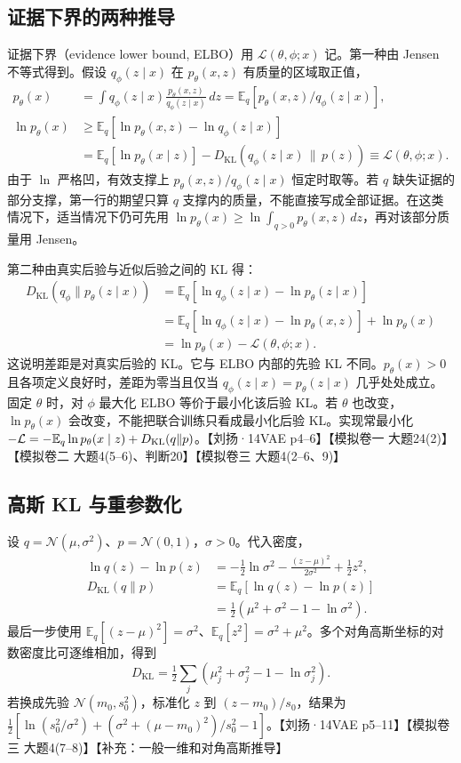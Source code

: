 \documentclass[UTF8,a4paper,zihao=-4,fontset=fandol]{ctexrep}
\begin{document}
\subsection*{证据下界的两种推导}

证据下界（evidence lower bound, ELBO）用 $\mathcal L(\theta,\phi;x)$ 记。第一种由 Jensen 不等式得到。假设 $q_\phi(z\mid x)$ 在 $p_\theta(x,z)$ 有质量的区域取正值，
\begin{align*}
 p_\theta(x)
  &=\int q_\phi(z\mid x)\frac{p_\theta(x,z)}{q_\phi(z\mid x)}\,dz
     =\mathbb E_q[p_\theta(x,z)/q_\phi(z\mid x)],\\
 \ln p_\theta(x)
  &\ge \mathbb E_q[\ln p_\theta(x,z)-\ln q_\phi(z\mid x)]\\
  &=\mathbb E_q[\ln p_\theta(x\mid z)]
     -D_{\mathrm{KL}}\!\left(q_\phi(z\mid x)\,\|\,p(z)\right)
     \equiv\mathcal L(\theta,\phi;x).
\end{align*}
由于 $\ln$ 严格凹，有效支撑上 $p_\theta(x,z)/q_\phi(z\mid x)$ 恒定时取等。若 $q$ 缺失证据的部分支撑，第一行的期望只算 $q$ 支撑内的质量，不能直接写成全部证据。在这类情况下，适当情况下仍可先用 $\ln p_\theta(x)\ge\ln\int_{q>0}p_\theta(x,z)\,dz$，再对该部分质量用 Jensen。

第二种由真实后验与近似后验之间的 KL 得：
\begin{align*}
 D_{\mathrm{KL}}(q_\phi\|p_\theta(z\mid x))
 &=\mathbb E_q[\ln q_\phi(z\mid x)-\ln p_\theta(z\mid x)]\\
 &=\mathbb E_q[\ln q_\phi(z\mid x)-\ln p_\theta(x,z)]
   +\ln p_\theta(x)\\
 &=\ln p_\theta(x)-\mathcal L(\theta,\phi;x).
\end{align*}
这说明差距是对真实后验的 KL。它与 ELBO 内部的先验 KL 不同。$p_\theta(x)>0$ 且各项定义良好时，差距为零当且仅当 $q_\phi(z\mid x)=p_\theta(z\mid x)$ 几乎处处成立。固定 $\theta$ 时，对 $\phi$ 最大化 ELBO 等价于最小化该后验 KL。若 $\theta$ 也改变，$\ln p_\theta(x)$ 会改变，不能把联合训练只看成最小化后验 KL。实现常最小化 $-\mathcal L=-\mathbb E_q\ln p_\theta(x\mid z)+D_{\rm KL}(q\|p)$。【刘扬·14VAE p4--6】【模拟卷一 大题24(2)】【模拟卷二 大题4(5--6)、判断20】【模拟卷三 大题4(2--6、9)】

\subsection*{高斯 KL 与重参数化}

设 $q=\mathcal N(\mu,\sigma^2)$、$p=\mathcal N(0,1)$，$\sigma>0$。代入密度，
\begin{align*}
 \ln q(z)-\ln p(z)
 &=-\tfrac12\ln\sigma^2-\frac{(z-\mu)^2}{2\sigma^2}+\tfrac12 z^2,\\
 D_{\mathrm{KL}}(q\|p)
 &=\mathbb E_q[\ln q(z)-\ln p(z)]\\
 &=\tfrac12\left(\mu^2+\sigma^2-1-\ln\sigma^2\right).
\end{align*}
最后一步使用 $\mathbb E_q[(z-\mu)^2]=\sigma^2$、$\mathbb E_q[z^2]=\sigma^2+\mu^2$。多个对角高斯坐标的对数密度比可逐维相加，得到
\[
 D_{\mathrm{KL}}=\tfrac12\sum_j(\mu_j^2+\sigma_j^2-1-\ln\sigma_j^2).
\]
若换成先验 $\mathcal N(m_0,s_0^2)$，标准化 $z$ 到 $(z-m_0)/s_0$，结果为
$\tfrac12[\ln(s_0^2/\sigma^2)+(\sigma^2+(\mu-m_0)^2)/s_0^2-1]$。【刘扬·14VAE p5--11】【模拟卷三 大题4(7--8)】【补充：一般一维和对角高斯推导】
\end{document}
